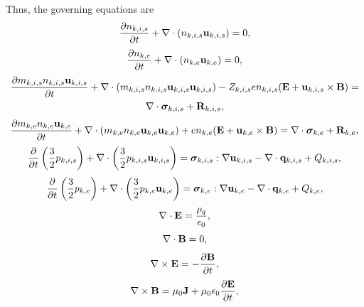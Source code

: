 \documentclass[a4paper,11pt]{report}
\begin{document}
Thus, the governing equations are
\begin{equation}
    \label{eq:mf_mm_ni}
    \frac{\partial n_{k,i,s}}{\partial t} + \nabla \cdot \left ( n_{k,i,s} \mathbf{u}_{k,i,s} \right ) = 0,
\end{equation}
\begin{equation}
    \label{eq:mf_mm_ne}
    \frac{\partial n_{k,e}}{\partial t} + \nabla \cdot \left ( n_{k,e} \mathbf{u}_{k,e} \right ) = 0,
\end{equation}
\begin{multline}
    \label{eq:mf_mm_ui}
    \frac{\partial m_{k,i,s} n_{k,i,s} \mathbf{u}_{k,i,s}}{\partial t} + \nabla \cdot \left( m_{k,i,s} n_{k.i,s} \mathbf{u}_{k,i,s} \mathbf{u}_{k,i,s} \right) - Z_{k,i,s} e n_{k,i,s} ( \mathbf{E} + \mathbf{u}_{k,i,s} \times \mathbf{B} ) = \\
    \nabla \cdot \bm \sigma_{k,i,s} + \mathbf{R}_{k,i,s},
\end{multline}
\begin{equation}
    \label{eq:mf_mm_ue}
    \frac{\partial m_{k,e} n_{k,e} \mathbf{u}_{k,e}}{\partial t} + \nabla \cdot \left ( m_{k,e} n_{k,e} \mathbf{u}_{k,e} \mathbf{u}_{k,e} \right) + e n_{k,e} ( \mathbf{E} + \mathbf{u}_{k,e} \times \mathbf{B} ) = \nabla \cdot \bm \sigma_{k,e} + \mathbf{R}_{k,e},
\end{equation}
\begin{equation}
    \label{eq:mf_mm_iei}
    \frac{\partial}{\partial t} \left ( \frac{3}{2} p_{k,i,s} \right ) + \nabla \cdot \left ( \frac{3}{2} p_{k,i,s} \mathbf{u}_{k,i,s} \right ) = \bm \sigma_{k,i,s} : \nabla \mathbf{u}_{k,i,s} - \nabla \cdot \mathbf{q}_{k,i,s} + Q_{k,i,s},
\end{equation}
\begin{equation}
    \label{eq:mf_mm_iee}
    \frac{\partial}{\partial t} \left ( \frac{3}{2} p_{k,e} \right ) + \nabla \cdot \left ( \frac{3}{2} p_{k,e} \mathbf{u}_{k,e} \right ) = \bm \sigma_{k,e} : \nabla \mathbf{u}_{k,e} - \nabla \cdot \mathbf{q}_{k,e} + Q_{k,e},
\end{equation}
\begin{equation}
    \label{eq:mf_mm_maxwell_3}
    \nabla \cdot \mathbf{E} = \frac{\rho_q}{\epsilon_0},
\end{equation}
\begin{equation}
    \label{eq:mf_mm_maxwell_4}
    \nabla \cdot \mathbf{B} = 0,
\end{equation}
\begin{equation}
    \label{eq:mf_mm_maxwell_1}
    \nabla \times \mathbf{E} = -\frac{ \partial \mathbf{B}}{\partial t},
\end{equation}
\begin{equation}
    \label{eq:mf_mm_maxwell_2}
    \nabla \times \mathbf{B} = \mu_0 \mathbf{J} + \mu_0 \epsilon_0 \frac{\partial \mathbf{E}}{\partial t},
\end{equation}
\end{document}

